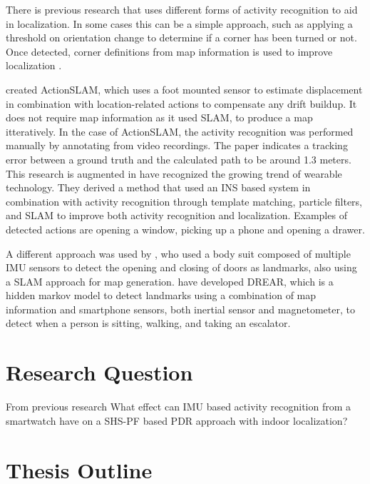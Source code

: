 There is previous research that uses different forms of activity recognition to aid in localization. In some cases this can be a simple approach, such as applying a threshold on orientation change to determine if a corner has been turned or not. Once detected, corner definitions from map information is used to improve localization \cite{Gu2019,Jackermeier2018}. \par 
\citet{Hardegger2012} created ActionSLAM, which uses a foot mounted sensor to estimate displacement in combination with location-related actions to compensate any drift buildup. It does not require map information as it used \ac{SLAM}, to produce a map itteratively. In the case of ActionSLAM, the activity recognition was performed manually by annotating from video recordings. The paper indicates a tracking error between a ground truth and the calculated path to be around 1.3 meters. This research is augmented in \citet{Hardegger2016} have recognized the growing trend of wearable technology. They derived a method that used an INS based system in combination with activity recognition through template matching, particle filters, and SLAM to improve both activity recognition and localization. Examples of detected actions are opening a window, picking up a phone and opening a drawer. \par
A different approach was used by \citet{Grzonka2010}, who used a body suit composed of multiple IMU sensors to detect the opening and closing of doors as landmarks, also using a \ac{SLAM} approach for map generation. \citet{Torok2014} have developed DREAR, which is a hidden markov model to detect landmarks using a combination of map information and smartphone sensors, both inertial sensor and magnetometer, to detect when a person is sitting, walking, and taking an escalator.

\section{Research Question}

From previous research 
What effect can \ac{IMU} based activity recognition from a smartwatch have on a \ac{SHS}-\ac{PF} based \ac{PDR} approach with indoor localization?


\section{Thesis Outline}



